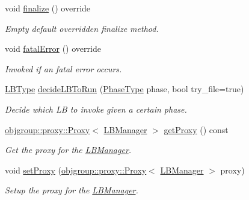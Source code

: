 \begin{DoxyCompactItemize}
void \hyperlink{structvt_1_1vrt_1_1collection_1_1balance_1_1_l_b_manager_a29f02da15bb40857ad425cec22758ac9}{finalize} () override
\begin{DoxyCompactList}\small\item\em Empty default overridden finalize method. \end{DoxyCompactList}\item 
void \hyperlink{structvt_1_1vrt_1_1collection_1_1balance_1_1_l_b_manager_ac13941c766e8b1b34c8591515e7942d3}{fatal\+Error} () override
\begin{DoxyCompactList}\small\item\em Invoked if an fatal error occurs. \end{DoxyCompactList}\item 
\hyperlink{namespacevt_1_1vrt_1_1collection_1_1balance_ac4f99693509affcc67db182d4aad9b5c}{L\+B\+Type} \hyperlink{structvt_1_1vrt_1_1collection_1_1balance_1_1_l_b_manager_a6c610e1c053f986932d8a59bb89eb37d}{decide\+L\+B\+To\+Run} (\hyperlink{namespacevt_a46ce6733d5cdbd735d561b7b4029f6d7}{Phase\+Type} phase, bool try\+\_\+file=true)
\begin{DoxyCompactList}\small\item\em Decide which LB to invoke given a certain phase. \end{DoxyCompactList}\item 
\hyperlink{structvt_1_1objgroup_1_1proxy_1_1_proxy}{objgroup\+::proxy\+::\+Proxy}$<$ \hyperlink{structvt_1_1vrt_1_1collection_1_1balance_1_1_l_b_manager}{L\+B\+Manager} $>$ \hyperlink{structvt_1_1vrt_1_1collection_1_1balance_1_1_l_b_manager_aa0fbba6d90873e5fa6e40767efcabb5c}{get\+Proxy} () const
\begin{DoxyCompactList}\small\item\em Get the proxy for the \hyperlink{structvt_1_1vrt_1_1collection_1_1balance_1_1_l_b_manager}{L\+B\+Manager}. \end{DoxyCompactList}\item 
void \hyperlink{structvt_1_1vrt_1_1collection_1_1balance_1_1_l_b_manager_aacef5b639acd9d984b9bcb79ecb9c6a9}{set\+Proxy} (\hyperlink{structvt_1_1objgroup_1_1proxy_1_1_proxy}{objgroup\+::proxy\+::\+Proxy}$<$ \hyperlink{structvt_1_1vrt_1_1collection_1_1balance_1_1_l_b_manager}{L\+B\+Manager} $>$ proxy)
\begin{DoxyCompactList}\small\item\em Setup the proxy for the \hyperlink{structvt_1_1vrt_1_1collection_1_1balance_1_1_l_b_manager}{L\+B\+Manager}. \end{DoxyCompactList}\item 

\end{DoxyCompactItemize}
